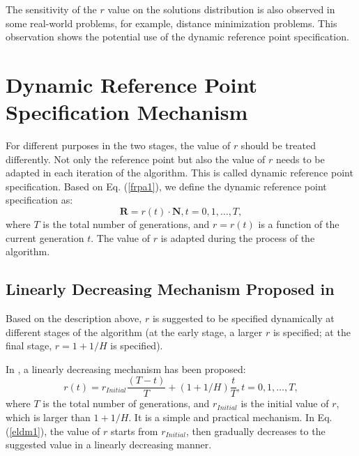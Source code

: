 \documentclass[conference]{IEEEtran}
\begin{document}
The sensitivity of the $r$ value on the solutions distribution is also observed in some real-world problems,
for example, distance minimization problems. 
This observation shows the potential use of the dynamic reference point specification\cite{hisao:dynamic}.

\section{Dynamic Reference Point Specification Mechanism}
For different purposes in the two stages, the value of $r$ should be treated differently\cite{hisao:dynamic}. 
Not only the reference point but also the value of $r$ 
needs to be adapted in each iteration of the algorithm. 
This is called dynamic reference point specification. 
Based on Eq. (\ref{frpa1}), 
we define the dynamic reference point specification as:
\begin{equation}\label{f2}
  \boldsymbol R = r(t) \cdot \boldsymbol N, 
  t=0,1,\dots,T,
\end{equation}
where $T$ is the total number of generations, and $r=r(t)$ is a function of the current generation $t$.
The value of $r$ is adapted during the process of the algorithm. 


% 
\subsection{Linearly Decreasing Mechanism Proposed in \cite{hisao:dynamic}} 
Based on the description above, $r$ is suggested to be specified dynamically at different stages of
the algorithm (at the early stage, a larger $r$ is specified; at the final stage, $r=1+1/H$ is specified).

In \cite{hisao:dynamic}, a linearly decreasing mechanism has been proposed:
\begin{equation}\label{eldm1}
  r(t)=r_{Initial}\frac{(T-t)}{T}+(1+1/H)\frac{t}{T}, t=0,1,\dots,T,
\end{equation}
where $T$ is the total number of generations, and $r_{Initial}$ is the initial value of $r$,
which is larger than $1+1/H$. 
It is a simple and practical mechanism. In Eq. (\ref{eldm1}), the value of $r$ starts from $r_{Initial}$,
then gradually decreases to the suggested value in a linearly decreasing manner. 
\end{document}
